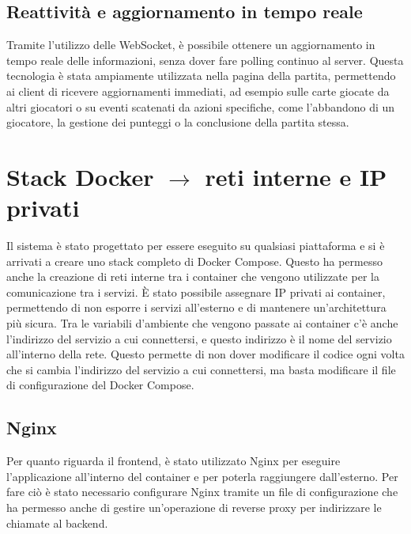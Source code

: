 \subsection{Reattività e aggiornamento in tempo reale}
Tramite l'utilizzo delle WebSocket, è possibile ottenere un aggiornamento in tempo reale delle informazioni, senza dover fare polling continuo al server. Questa tecnologia è stata ampiamente utilizzata nella pagina della partita, permettendo ai client di ricevere aggiornamenti immediati, ad esempio sulle carte giocate da altri giocatori o su eventi scatenati da azioni specifiche, come l'abbandono di un giocatore, la gestione dei punteggi o la conclusione della partita stessa.

\section{Stack Docker $ \rightarrow $ reti interne e IP privati}

Il sistema è stato progettato per essere eseguito su qualsiasi piattaforma e si è arrivati a creare uno stack completo di Docker Compose. Questo ha permesso anche la creazione di reti interne tra i container che vengono utilizzate per la comunicazione tra i servizi. È stato possibile assegnare IP privati ai container, permettendo di non esporre i servizi all'esterno e di mantenere un'architettura più sicura. Tra le variabili d'ambiente che vengono passate ai container c'è anche l'indirizzo del servizio a cui connettersi, e questo indirizzo è il nome del servizio all'interno della rete. Questo permette di non dover modificare il codice ogni volta che si cambia l'indirizzo del servizio a cui connettersi, ma basta modificare il file di configurazione del Docker Compose.
\subsection{Nginx} \label{Nginx}
Per quanto riguarda il frontend, è stato utilizzato Nginx per eseguire l'applicazione all'interno del container e per poterla raggiungere dall'esterno. Per fare ciò è stato necessario configurare Nginx tramite un file di configurazione che ha permesso anche di gestire un'operazione di reverse proxy per indirizzare le chiamate al backend.

